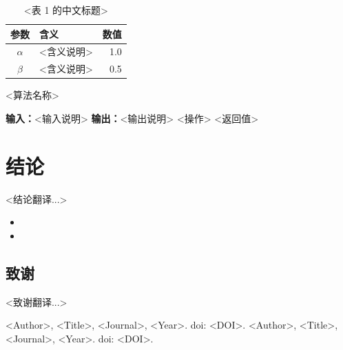 \documentclass[a4paper,11pt]{article}
\providecommand{\bipar}[2]{#2}
\providecommand{\bihead}[2]{#2}
\providecommand{\bisection}[2]{\section{#2}}
\providecommand{\biitem}[2]{\item #2}
\begin{document}
\begin{table}[ht]
\centering
\caption{\bihead{<Table 1 original caption>}{<表 1 的中文标题>}}
\label{tab:t1}
\begin{tabularx}{0.85\textwidth}{c X r}
\toprule
参数 & 含义 & 数值 \\
\midrule
$\alpha$ & <含义说明> & 1.0 \\
$\beta$  & <含义说明> & 0.5 \\
\bottomrule
\end{tabularx}
\end{table}

\begin{algorithm}[ht]
\caption{\bihead{<Algorithm name>}{<算法名称>}}
\label{alg:a1}
\begin{algorithmic}[1]
\State \textbf{输入：}<输入说明>
\State \textbf{输出：}<输出说明>
    \State <操作>
  \EndIf
\EndFor
\State \Return <返回值>
\end{algorithmic}
\end{algorithm}

\bisection{Conclusion}{结论}
\label{sec:conclusion}

\bipar{<原文结论>}{<结论翻译...>}

\begin{itemize}
\biitem{<原文要点 1>}{<要点 1 译文>}
\biitem{<原文要点 2>}{<要点 2 译文>}
\end{itemize}

\subsection*{\bihead{Acknowledgements}{致谢}}
\bipar{<原文致谢>}{<致谢翻译...>}

\begin{thebibliography}{99}
\small
{} <Author>, <Title>, <Journal>, <Year>. doi: <DOI>.
 <Author>, <Title>, <Journal>, <Year>. doi: <DOI>.
\end{thebibliography}
\end{document}
